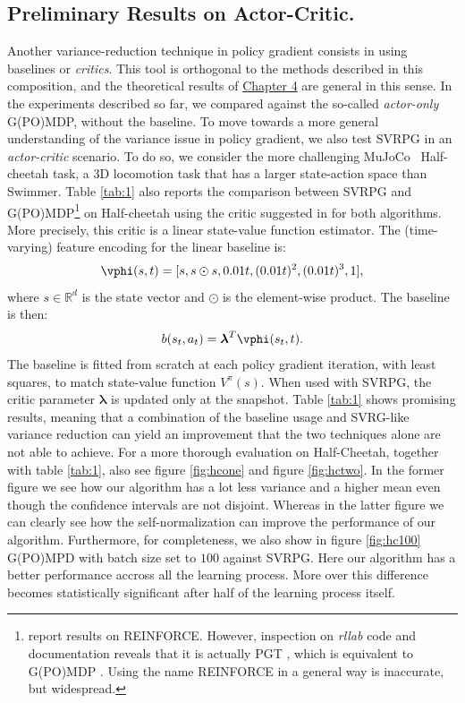 \subsection{Preliminary Results on Actor-Critic.}\label{subsec:actorcritic} %
Another variance-reduction technique in policy gradient consists in using baselines or \textit{critics}. This tool is orthogonal to the methods described in this composition, and the theoretical results of \hyperref[chap:convergence]{Chapter 4} are general in this sense. In the experiments described so far, we compared against the so-called \textit{actor-only} G(PO)MDP, \ie without the baseline. To move towards a more general understanding of the variance issue in policy gradient, we also test \acs{SVRPG} in an \textit{actor-critic} scenario. To do so, we consider the more challenging MuJoCo~\citep{todorov2012mujoco} Half-cheetah task, a 3D locomotion task that has a larger state-action space than Swimmer. Table \ref{tab:1} also reports the comparison between \acs{SVRPG} and G(PO)MDP\footnote{\citet{duan2016benchmarking} report results on REINFORCE. However, inspection on \textit{rllab} code and documentation reveals that it is actually \ac{PGT} \citep{sutton2000policy}, which is equivalent to G(PO)MDP \citep[shown by][]{peters2008reinforcement}. Using the name REINFORCE in a general way is inaccurate, but widespread.} on Half-cheetah using the critic suggested in \cite{duan2016benchmarking} for both algorithms. More precisely, this critic is a linear state-value function estimator. 
The (time-varying) feature encoding for the linear baseline is:
\begin{align*}
\vphi(s,t)=[s, s \odot s, 0.01t, (0.01t)^2, (0.01t)^3,1],
\end{align*}
where $s\in\mathbb{R}^d$ is the state vector and $\odot$ is the element-wise product. The baseline is then:
\[
b(s_t,a_t) = \boldsymbol{\lambda}^T\vphi(s_t,t).
\]
The baseline is fitted from scratch at each policy gradient iteration, with least squares, to match state-value function $V^{\pi}(s)$.
When used with \acs{SVRPG}, the critic parameter $\boldsymbol{\lambda}$ is updated only at the snapshot. Table \ref{tab:1} shows promising results, meaning that a combination of the baseline usage and \acs{SVRG}-like variance reduction can yield an improvement that the two techniques alone are not able to achieve. For a more thorough evaluation on Half-Cheetah, together with table \ref{tab:1}, also see figure \ref{fig:hcone} and figure \ref{fig:hctwo}. In the former figure we see how our algorithm has a lot less variance and a higher mean even though the confidence intervals are not disjoint. Whereas in the latter figure we can clearly see how the self-normalization can improve the performance of our algorithm. Furthermore, for completeness, we also show in figure \ref{fig:hc100} G(PO)MPD with batch size set to $100$ against \acs{SVRPG}. Here our algorithm has a better performance accross all the learning process. More over this difference becomes statistically significant after half of the learning process itself. 
